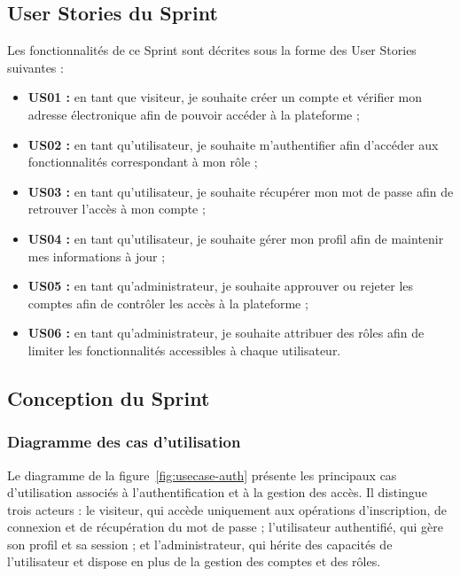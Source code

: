 \subsection{User Stories du Sprint}

Les fonctionnalités de ce Sprint sont décrites sous la forme des User Stories suivantes :

{\small
\begin{itemize}
    \item \textbf{US01 :} en tant que visiteur, je souhaite créer un compte et vérifier mon adresse électronique afin de pouvoir accéder à la plateforme ;
    \item \textbf{US02 :} en tant qu'utilisateur, je souhaite m'authentifier afin d'accéder aux fonctionnalités correspondant à mon rôle ;
    \item \textbf{US03 :} en tant qu'utilisateur, je souhaite récupérer mon mot de passe afin de retrouver l'accès à mon compte ;
    \item \textbf{US04 :} en tant qu'utilisateur, je souhaite gérer mon profil afin de maintenir mes informations à jour ;
    \item \textbf{US05 :} en tant qu'administrateur, je souhaite approuver ou rejeter les comptes afin de contrôler les accès à la plateforme ;
    \item \textbf{US06 :} en tant qu'administrateur, je souhaite attribuer des rôles afin de limiter les fonctionnalités accessibles à chaque utilisateur.
\end{itemize}}

\subsection{Conception du Sprint}

\subsubsection{Diagramme des cas d'utilisation}

Le diagramme de la figure~\ref{fig:usecase-auth} présente les principaux cas d'utilisation associés à l'authentification et à la gestion des accès. Il distingue trois acteurs : le visiteur, qui accède uniquement aux opérations d'inscription, de connexion et de récupération du mot de passe ; l'utilisateur authentifié, qui gère son profil et sa session ; et l'administrateur, qui hérite des capacités de l'utilisateur et dispose en plus de la gestion des comptes et des rôles.

